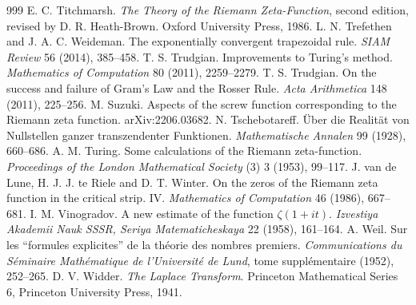 \begin{thebibliography}{999}
 E. C. Titchmarsh. \emph{The Theory of the Riemann Zeta-Function}, second edition, revised by D. R. Heath-Brown. Oxford University Press, 1986.
 L. N. Trefethen and J. A. C. Weideman. The exponentially convergent trapezoidal rule. \emph{SIAM Review} 56 (2014), 385--458.
 T. S. Trudgian. Improvements to Turing's method. \emph{Mathematics of Computation} 80 (2011), 2259--2279.
 T. S. Trudgian. On the success and failure of Gram's Law and the Rosser Rule. \emph{Acta Arithmetica} 148 (2011), 225--256.
 M. Suzuki. Aspects of the screw function corresponding to the Riemann zeta function. arXiv:2206.03682.
 N. Tschebotareff. \"Uber die Realit\"at von Nullstellen ganzer transzendenter Funktionen. \emph{Mathematische Annalen} 99 (1928), 660--686.
 A. M. Turing. Some calculations of the Riemann zeta-function. \emph{Proceedings of the London Mathematical Society} (3) 3 (1953), 99--117.
 J. van de Lune, H. J. J. te Riele and D. T. Winter. On the zeros of the Riemann zeta function in the critical strip. IV. \emph{Mathematics of Computation} 46 (1986), 667--681.
 I. M. Vinogradov. A new estimate of the function $\zeta(1+it)$. \emph{Izvestiya Akademii Nauk SSSR, Seriya Matematicheskaya} 22 (1958), 161--164.
 A. Weil. Sur les ``formules explicites'' de la th\'eorie des nombres premiers. \emph{Communications du S\'eminaire Math\'ematique de l'Universit\'e de Lund}, tome suppl\'ementaire (1952), 252--265.
 D. V. Widder. \emph{The Laplace Transform}. Princeton Mathematical Series 6, Princeton University Press, 1941.

\end{thebibliography}
